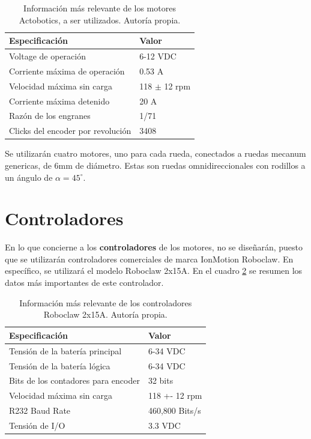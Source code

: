 \begin{table}[H]
\caption{Información más relevante de los motores Actobotics, a ser utilizados. Autoría propia.}
\begin{tabular}{|l|l|}
\hline
Especificación                & Valor         \\ \hline
Voltage de operación          & 6-12 VDC      \\ \hline
Corriente máxima de operación & 0.53 A        \\ \hline
Velocidad máxima sin carga    & 118 $\pm$ 12 rpm \\ \hline
Corriente máxima detenido     & 20 A          \\ \hline
Razón de los engranes         & 1/71          \\ \hline
Clicks del encoder por revolución & 3408      \\ \hline
\end{tabular}
\label{T:actobotics}
\end{table}

Se utilizarán cuatro motores, uno para cada rueda, conectados a ruedas mecanum genericas, de 6mm de diámetro. Estas son ruedas omnidireccionales con rodillos a un ángulo de $\alpha = 45^\circ$.

\section{Controladores}

En lo que concierne a los \textbf{controladores} de los motores, no se diseñarán, puesto que se utilizarán controladores comerciales de marca IonMotion Roboclaw. En específico, se utilizará el modelo Roboclaw 2x15A. En el cuadro \ref{T:roboclaw} se resumen los datos más importantes de este controlador.

\begin{table}[H]
\caption{Información más relevante de los controladores Roboclaw 2x15A. Autoría propia.}
\begin{tabular}{|l|l|}
\hline
Especificación                      & Valor          \\ \hline
Tensión de la batería principal     & 6-34 VDC       \\ \hline
Tensión de la batería lógica        & 6-34 VDC       \\ \hline
Bits de los contadores para encoder & 32 bits        \\ \hline
Velocidad máxima sin carga          & 118 +- 12 rpm  \\ \hline
R232 Baud Rate                      & 460,800 Bits/s \\ \hline
Tensión de I/O                      & 3.3 VDC        \\ \hline
\end{tabular}
\label{T:roboclaw}
\end{table}

